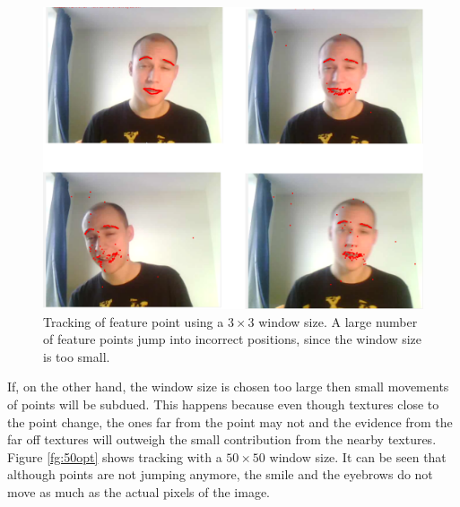 \documentclass[11pt,a4paper]{report}
\begin{document}
\begin{figure}[H]
\begin{centering}
\includegraphics[scale=0.28]{images/3x3opt2.png}
\par\end{centering}

\caption{Tracking of feature point using a $3 \times 3$ window size. A large
  number of feature points jump into incorrect positions, since the
  window size is too small.}
\label{fg:3opt}
\end{figure}


If, on the other hand, the window size is chosen too large then small movements of
points will be subdued. This happens because even though textures close to the
point change, the ones far from the point may not and the evidence from the far
off textures will outweigh the small contribution from the nearby
textures. Figure \ref{fg:50opt} shows tracking with a $50 \times 50$ window
size. It can be seen that although points are not jumping anymore, the smile and
the eyebrows do not move as much as the actual pixels of the image.
\end{document}
